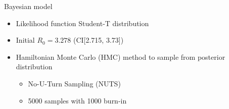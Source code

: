 \documentclass{beamer}
\begin{document}
\begin{frame}{Bayesian model}

\begin{figure}
	\centering
\end{figure}
\begin{itemize}
	\footnotesize
	\item<2-> Likelihood function Student-T distribution
	\item<3-> Initial $R_0 =3.278$ (CI[2.715, 3.73])
	\item<4-> Hamiltonian Monte Carlo (HMC) method to sample from posterior distribution
	
	\begin{itemize} 	
		\item<4 -> No-U-Turn Sampling (NUTS)
		\item<4-> 5000 samples with 1000 burn-in
	\end{itemize}
\end{itemize}

\end{frame}
\end{document}
